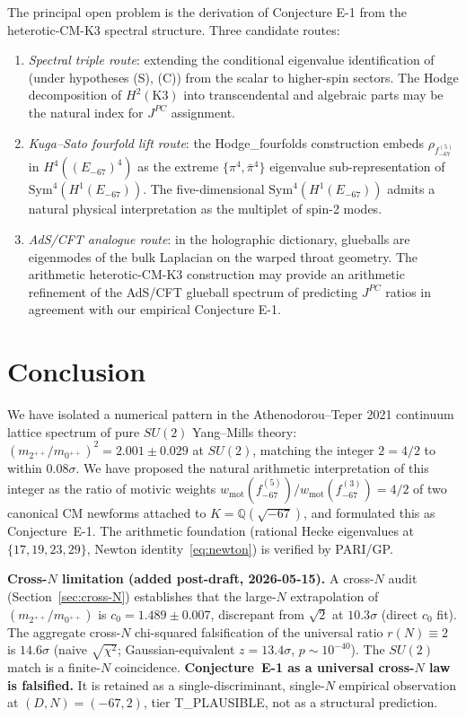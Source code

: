 \documentclass[11pt,a4paper]{amsart}
\providecommand{\Sym}{\mathrm{Sym}}
\providecommand{\Q}{\mathbb{Q}}
\theoremstyle{definition}
\begin{document}
The principal open problem is the derivation of Conjecture E-1 from the
heterotic-CM-K3 spectral structure. Three candidate routes:
\begin{enumerate}\setlength\itemsep{2pt}
\item \emph{Spectral triple route}: extending the conditional eigenvalue
      identification of \cite[\S6]{CCNCG-K3FSM} (under hypotheses (S), (C)) from
      the scalar to higher-spin sectors. The Hodge decomposition of $H^{2}(\mathrm{K3})$
      into transcendental and algebraic parts may be the natural index for $J^{PC}$
      assignment.
\item \emph{Kuga--Sato fourfold lift route}: the Hodge\_fourfolds construction
      \cite[\S2.3]{HodgeFourfolds} embeds $\rho_{f_{-67}^{(5)}}$ in $H^{4}((E_{-67})^{4})$ as
      the extreme $\{\pi^{4}, \bar\pi^{4}\}$ eigenvalue sub-representation of $\Sym^{4}(H^{1}(E_{-67}))$.
      The five-dimensional $\Sym^{4}(H^{1}(E_{-67}))$ admits a natural physical
      interpretation as the multiplet of spin-2 modes.
\item \emph{AdS/CFT analogue route}: in the holographic dictionary, glueballs are
      eigenmodes of the bulk Laplacian on the warped throat geometry. The arithmetic
      heterotic-CM-K3 construction may provide an arithmetic refinement of the
      AdS/CFT glueball spectrum of \cite[Section 4]{Brower2000} predicting
      $J^{PC}$ ratios in agreement with our empirical Conjecture E-1.
\end{enumerate}

\section{Conclusion}\label{sec:conclusion}

We have isolated a numerical pattern in the Athenodorou--Teper 2021 continuum
lattice spectrum of pure $SU(2)$ Yang--Mills theory:
$(m_{2^{++}}/m_{0^{++}})^{2} = 2.001 \pm 0.029$ at $SU(2)$, matching the
integer $2 = 4/2$ to within $0.08\sigma$.
We have proposed the natural arithmetic interpretation of this integer as the
ratio of motivic weights $w_{\mathrm{mot}}(f_{-67}^{(5)}) / w_{\mathrm{mot}}(f_{-67}^{(3)}) = 4/2$
of two canonical CM newforms attached to $K = \Q(\sqrt{-67})$, and formulated
this as Conjecture~E-1.
The arithmetic foundation (rational Hecke eigenvalues at $\{17, 19, 23, 29\}$,
Newton identity~\eqref{eq:newton}) is verified by PARI/GP.

\textbf{Cross-$N$ limitation (added post-draft, 2026-05-15).}
A cross-$N$ audit (Section~\ref{sec:cross-N}) establishes that the large-$N$
extrapolation of $(m_{2^{++}}/m_{0^{++}})$ is $c_{0} = 1.489 \pm 0.007$,
discrepant from $\sqrt{2}$ at $10.3\sigma$ (direct $c_{0}$ fit). The aggregate
cross-$N$ chi-squared falsification of the universal ratio
$r(N) \equiv 2$ is $14.6\sigma$ (naive $\sqrt{\chi^{2}}$; Gaussian-equivalent
$z = 13.4\sigma$, $p \sim 10^{-40}$).
The $SU(2)$ match is a finite-$N$ coincidence.
\textbf{Conjecture~E-1 as a universal cross-$N$ law is falsified.}
It is retained as a single-discriminant, single-$N$ empirical observation at
$(D, N) = (-67, 2)$, tier T\_PLAUSIBLE, not as a structural prediction.
\end{document}
